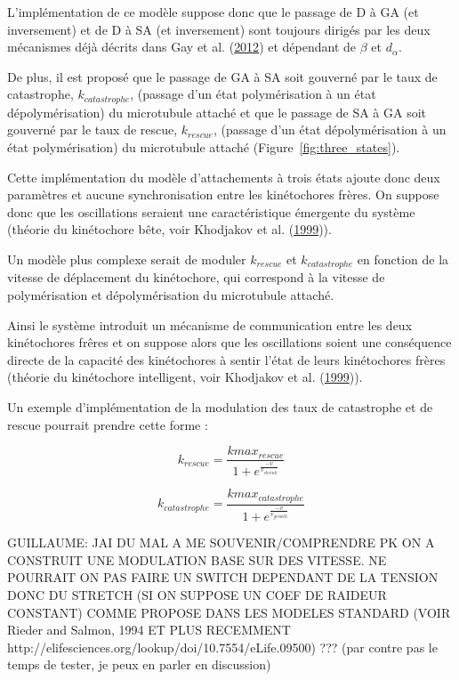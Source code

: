 \documentclass[12pt,a4paper,twoside,openright]{book}
\begin{document}
L'implémentation de ce modèle suppose donc que le passage de D à GA (et
inversement) et de D à SA (et inversement) sont toujours dirigés par les
deux mécanismes déjà décrits dans Gay et al.
(\hyperref[ref-Gay2012a]{2012}) et dépendant de \(\beta\) et
\(d_{\alpha}\).

De plus, il est proposé que le passage de GA à SA soit gouverné par le
taux de catastrophe, \(k_{catastrophe}\), (passage d'un état
polymérisation à un état dépolymérisation) du microtubule attaché et que
le passage de SA à GA soit gouverné par le taux de rescue,
\(k_{rescue}\), (passage d'un état dépolymérisation à un état
polymérisation) du microtubule attaché (Figure~\ref{fig:three_states}).

Cette implémentation du modèle d'attachements à trois états ajoute donc
deux paramètres et aucune synchronisation entre les kinétochores frères.
On suppose donc que les oscillations seraient une caractéristique
émergente du système (théorie du kinétochore bête, voir Khodjakov et al.
(\hyperref[ref-Khodjakov1999]{1999})).

Un modèle plus complexe serait de moduler \(k_{rescue}\) et
\(k_{catastrophe}\) en fonction de la vitesse de déplacement du
kinétochore, qui correspond à la vitesse de polymérisation et
dépolymérisation du microtubule attaché.

Ainsi le système introduit un mécanisme de communication entre les deux
kinétochores frêres et on suppose alors que les oscillations soient une
conséquence directe de la capacité des kinétochores à sentir l'état de
leurs kinétochores frères (théorie du kinétochore intelligent, voir
Khodjakov et al. (\hyperref[ref-Khodjakov1999]{1999})).

Un exemple d'implémentation de la modulation des taux de catastrophe et
de rescue pourrait prendre cette forme :

\[
k_{rescue} = \frac{kmax_{rescue}}{1 + e^{\frac{-v}{v_{shrink}}}}
\]

\[
k_{catastrophe} = \frac{kmax_{catastrophe}}{1 + e^{\frac{-v}{v_{growth}}}}
\]

GUILLAUME: JAI DU MAL A ME SOUVENIR/COMPRENDRE PK ON A CONSTRUIT UNE
MODULATION BASE SUR DES VITESSE. NE POURRAIT ON PAS FAIRE UN SWITCH
DEPENDANT DE LA TENSION DONC DU STRETCH (SI ON SUPPOSE UN COEF DE
RAIDEUR CONSTANT) COMME PROPOSE DANS LES MODELES STANDARD (VOIR Rieder
and Salmon, 1994 ET PLUS RECEMMENT
http://elifesciences.org/lookup/doi/10.7554/eLife.09500) ??? (par contre
pas le temps de tester, je peux en parler en discussion)
\end{document}

